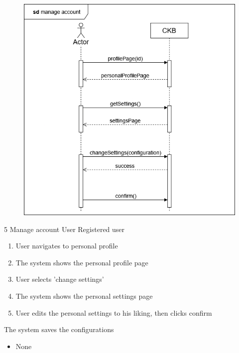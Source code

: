 \usecase
{
    \begin{figure}[H]
        \centering
        \includegraphics[width=\textwidth]{src/sequence_diagrams/manageaccount.png}
    \end{figure}
}
{5}
{Manage account} %
{User} %
{Registered user} %
{ %
    \begin{enumerate}
        \item User navigates to personal profile
        \item The system shows the personal profile page
        \item User selects 'change settings'
        \item The system shows the personal settings page
        \item User edits the personal settings to his liking, then clicks confirm
    \end{enumerate}
}
{The system saves the configurations} %
{ %
    \begin{itemize}
        \item None
    \end{itemize}
}
{ %

}


